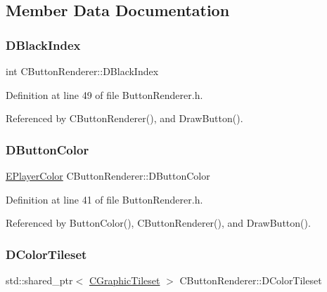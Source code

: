 \subsection{Member Data Documentation}
\hypertarget{classCButtonRenderer_ac5306adba14177b75998e4ffc79a7295}{}\label{classCButtonRenderer_ac5306adba14177b75998e4ffc79a7295} 
\subsubsection{\texorpdfstring{D\+Black\+Index}{DBlackIndex}}
{\footnotesize\ttfamily int C\+Button\+Renderer\+::\+D\+Black\+Index\hspace{0.3cm}{\ttfamily [protected]}}



Definition at line 49 of file Button\+Renderer.\+h.



Referenced by C\+Button\+Renderer(), and Draw\+Button().

\hypertarget{classCButtonRenderer_a8b2bce7400657eb1a8f896b070d11996}{}\label{classCButtonRenderer_a8b2bce7400657eb1a8f896b070d11996} 
\subsubsection{\texorpdfstring{D\+Button\+Color}{DButtonColor}}
{\footnotesize\ttfamily \hyperlink{GameDataTypes_8h_aafb0ca75933357ff28a6d7efbdd7602f}{E\+Player\+Color} C\+Button\+Renderer\+::\+D\+Button\+Color\hspace{0.3cm}{\ttfamily [protected]}}



Definition at line 41 of file Button\+Renderer.\+h.



Referenced by Button\+Color(), C\+Button\+Renderer(), and Draw\+Button().

\hypertarget{classCButtonRenderer_aa823ae99f3642927241c085963888128}{}\label{classCButtonRenderer_aa823ae99f3642927241c085963888128} 
\subsubsection{\texorpdfstring{D\+Color\+Tileset}{DColorTileset}}
{\footnotesize\ttfamily std\+::shared\+\_\+ptr$<$ \hyperlink{classCGraphicTileset}{C\+Graphic\+Tileset} $>$ C\+Button\+Renderer\+::\+D\+Color\+Tileset\hspace{0.3cm}{\ttfamily [protected]}}




